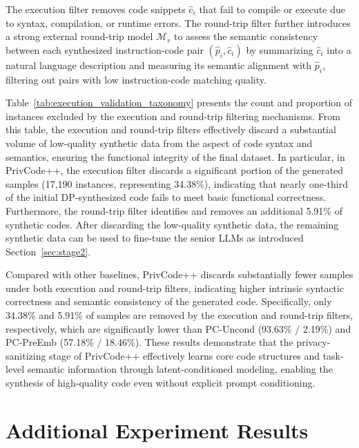 \documentclass{article}
\theoremstyle{plain}
\theoremstyle{definition}
\theoremstyle{remark}
\def \toolname{PrivCode++}
\begin{document}
{The execution filter removes code snippets $\hat{c}_i$ that fail to compile or execute due to syntax, compilation, or runtime errors. The round-trip filter further introduces a strong external round-trip model $\mathcal{M}_r$ to assess the semantic consistency between each synthesized instruction-code pair $(\hat{p}_i, \hat{c}_i)$ by summarizing $\hat{c}_i$ into a natural language description and measuring its semantic alignment with $\hat{p}_i$, filtering out pairs with low instruction-code matching quality.


Table~\ref{tab:execution_validation_taxonomy} presents the count and proportion of instances excluded by the execution and round-trip filtering mechanisms. From this table, the execution and round-trip filters effectively discard a substantial volume of low-quality synthetic data from the aspect of code syntax and semantics, ensuring the functional integrity of the final dataset. In particular, in \toolname{}, the execution filter discards a significant portion of the generated samples (17,190 instances, representing 34.38\%), indicating that nearly one-third of the initial DP-synthesized code fails to meet basic functional correctness. Furthermore, the round-trip filter identifies and removes an additional 5.91\% of synthetic codes. After discarding the low-quality synthetic data, the remaining synthetic data can be used to fine-tune the senior LLMs as introduced Section~\ref{sec:stage2}.

Compared with other baselines, \toolname{} discards substantially fewer samples under both execution and round-trip filters, indicating higher intrinsic syntactic correctness and semantic consistency of the generated code. Specifically, only 34.38\% and 5.91\% of samples are removed by the execution and round-trip filters, respectively, which are significantly lower than PC-Uncond (93.63\% / 2.19\%) and PC-PreEmb (57.18\% / 18.46\%). These results demonstrate that the privacy-sanitizing stage of \toolname{} effectively learns core code structures and task-level semantic information through latent-conditioned modeling, enabling the synthesis of high-quality code even without explicit prompt conditioning.





\section{Additional Experiment Results}



}
\end{document}
